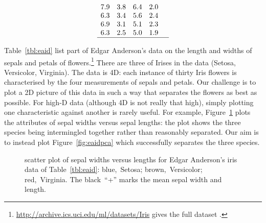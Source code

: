 \begin{example}
\begin{table}
\begin{equation*}
\begin{array}{rrrrl}
\\7.9&3.8&6.4&2.0&
\\6.3&3.4&5.6&2.4&
\\6.9&3.1&5.1&2.3&
\\6.3&2.5&5.0&1.9&
\\\hline
\end{array}
\end{equation*}
\end{table}
Table~\ref{tbl:eaid} list part of Edgar Anderson's data on the length and widths of sepals and petals of  flowers.\footnote{\url{http://archive.ics.uci.edu/ml/datasets/Iris} gives the full dataset \cite[]{Lichman2013}.}
There are three  of Irises in the data (Setosa, Versicolor, Virginia).
The data is 4D: each instance of thirty Iris flowers is characterised by the four measurements of sepals and petals.
Our challenge is to plot a 2D picture of this data in such a way that separates the flowers as best as possible.
For high-D data (although 4D is not really that high), simply plotting one characteristic against another is rarely useful.
For example,  Figure~\ref{fig:eaid} plots the attributes of sepal widths versus sepal lengths: the plot shows the three species being intermingled together rather than reasonably separated.
Our aim is to instead plot Figure~\ref{fig:eaidpca} which successfully separates the three species.

\begin{figure}
\centering
{}
\caption{scatter plot of sepal widths versus lengths for Edgar Anderson's iris data of Table~\ref{tbl:eaid}: blue,~Setosa; brown,~Versicolor; red,~Virginia.  
The black~``+'' marks the mean sepal width and length.}
\label{fig:eaid}
\end{figure}


\end{example}
